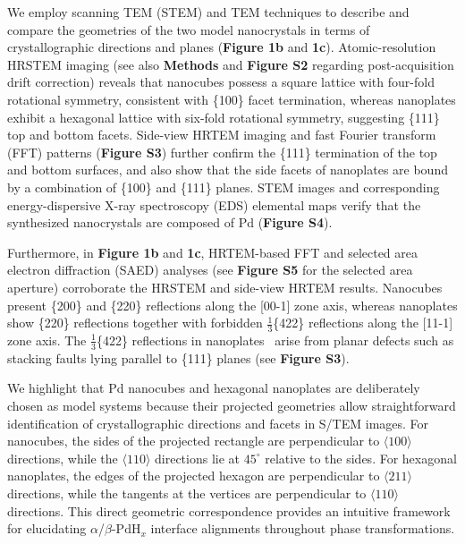 \documentclass[reprint,amsmath,amssymb,aip,nofootinbib, citeautoscript,]{revtex4-2}
\begin{document}
We employ scanning TEM (STEM) and TEM techniques to describe and compare the geometries of the two model nanocrystals in terms of crystallographic directions and planes (\textbf{Figure 1b} and \textbf{1c}). Atomic-resolution HRSTEM imaging (see also \textbf{Methods} and \textbf{Figure S2} regarding post-acquisition drift correction) reveals that nanocubes possess a square lattice with four-fold rotational symmetry, consistent with \{100\} facet termination, whereas nanoplates exhibit a hexagonal lattice with six-fold rotational symmetry, suggesting \{111\} top and bottom facets. Side-view HRTEM imaging and fast Fourier transform (FFT) patterns (\textbf{Figure S3}) further confirm the \{111\} termination of the top and bottom surfaces, and also show that the side facets of nanoplates are bound by a combination of \{100\} and \{111\} planes. STEM images and corresponding energy-dispersive X-ray spectroscopy (EDS) elemental maps verify that the synthesized nanocrystals are composed of Pd (\textbf{Figure S4}).


Furthermore, in \textbf{Figure 1b} and \textbf{1c}, HRTEM-based FFT and selected area electron diffraction (SAED) analyses (see \textbf{Figure S5} for the selected area aperture) corroborate the HRSTEM and side-view HRTEM results. Nanocubes present \{200\} and \{220\} reflections along the [00-1] zone axis, whereas nanoplates show \{220\} reflections together with forbidden $\frac{1}{3}$\{422\} reflections along the [11-1] zone axis. The $\frac{1}{3}$\{422\} reflections in nanoplates~\cite{xiong_polyvinyl_2006,kirkland_structural_1993,xiong_kinetically_2005,germain_stacking_2003} arise from planar defects such as stacking faults lying parallel to \{111\} planes (see \textbf{Figure S3}).


We highlight that Pd nanocubes and hexagonal nanoplates are deliberately chosen as model systems because their projected geometries allow straightforward identification of crystallographic directions and facets in S/TEM images. For nanocubes, the sides of the projected rectangle are perpendicular to $\langle100\rangle$ directions, while the $\langle110\rangle$ directions lie at $45 ^\circ$ relative to the sides. For hexagonal nanoplates, the edges of the projected hexagon are perpendicular to $\langle211\rangle$ directions, while the tangents at the vertices are perpendicular to $\langle110\rangle$ directions. This direct geometric correspondence provides an intuitive framework for elucidating $\alpha$/$\beta$-$\mathrm{PdH}_x$ interface alignments throughout phase transformations.
\end{document}
